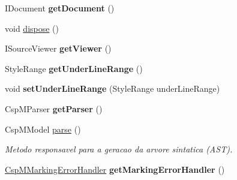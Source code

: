 \begin{DoxyCompactItemize}
I\+Document {\bfseries get\+Document} ()
\item 
void \hyperlink{classcom_1_1fware_1_1cspdt_1_1cspm_1_1editor_1_1_csp_m_editor_ac418cf2c7e96b563d27c3acf127ec1cb}{dispose} ()
\item 
\mbox{\label{classcom_1_1fware_1_1cspdt_1_1cspm_1_1editor_1_1_csp_m_editor_a756a5c72d5fb29ce9755892392e7aa65}} 
I\+Source\+Viewer {\bfseries get\+Viewer} ()
\item 
\mbox{\label{classcom_1_1fware_1_1cspdt_1_1cspm_1_1editor_1_1_csp_m_editor_ac9ab0ff6658265253f92d3a20181d2d1}} 
Style\+Range {\bfseries get\+Under\+Line\+Range} ()
\item 
\mbox{\label{classcom_1_1fware_1_1cspdt_1_1cspm_1_1editor_1_1_csp_m_editor_a144d495291f4717d7c5f36ceabefac93}} 
void {\bfseries set\+Under\+Line\+Range} (Style\+Range under\+Line\+Range)
\item 
\mbox{\label{classcom_1_1fware_1_1cspdt_1_1cspm_1_1editor_1_1_csp_m_editor_a895b1a97641241786ef7f7f74b678f07}} 
Csp\+M\+Parser {\bfseries get\+Parser} ()
\item 
Csp\+M\+Model \hyperlink{classcom_1_1fware_1_1cspdt_1_1cspm_1_1editor_1_1_csp_m_editor_a8507980bcb241d6990f3c21c78380c32}{parse} ()
\begin{DoxyCompactList}\small\item\em Metodo responsavel para a geracao da arvore sintatica (A\+ST). \end{DoxyCompactList}\item 
\mbox{\label{classcom_1_1fware_1_1cspdt_1_1cspm_1_1editor_1_1_csp_m_editor_ab760376d978f7985102f1ba62326b763}} 
\hyperlink{classcom_1_1fware_1_1cspdt_1_1cspm_1_1editor_1_1marker_1_1_csp_m_marking_error_handler}{Csp\+M\+Marking\+Error\+Handler} {\bfseries get\+Marking\+Error\+Handler} ()
\item 
\mbox{\label{classcom_1_1fware_1_1cspdt_1_1cspm_1_1editor_1_1_csp_m_editor_a59af88045ea8062603b190e05365a5c4}} 

\end{DoxyCompactItemize}
